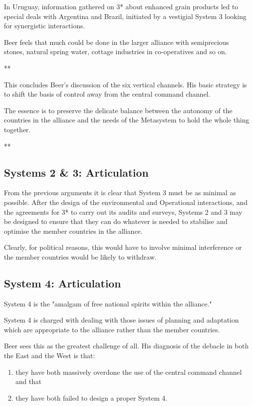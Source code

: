 In Uruguay, information gathered on 3* about enhanced grain products led to special deals with Argentina and Brazil, initiated by a vestigial System 3 looking for synergistic interactions.

Beer feels that much could be done in the larger alliance with semiprecious stones, natural spring water, cottage industries in co-operatives and so on.

**

This concludes Beer's discussion of the six vertical channels. His basic strategy is to shift the basis of control away from the central command channel.

The essence is to preserve the delicate balance between the autonomy of the countries in the alliance and the needs of the Metasystem to hold the whole thing together.

**

\subsection*{Systems 2 \& 3: Articulation}
From the previous arguments it is clear that System 3 must be as minimal as possible. After the design of the environmental and Operational interactions, and the agreements for 3* to carry out its audits and surveys, Systems 2 and 3 may be designed to ensure that they can do whatever is needed to stabilise and optimise the member countries in the alliance.

Clearly, for political reasons, this would have to involve minimal interference or the member countries would be likely to withdraw.

\subsection*{System 4: Articulation}
System 4 is the "amalgam of free national spirits within the alliance."

System 4 is charged with dealing with those issues of planning and adaptation which are appropriate to the alliance rather than the member countries.

Beer sees this as the greatest challenge of all. His diagnosis of the debacle in both the East and the West is that:

\begin{enumerate}
  \item they have both massively overdone the use of the central command channel and that

  \item they have both failed to design a proper System 4.

\end{enumerate}

